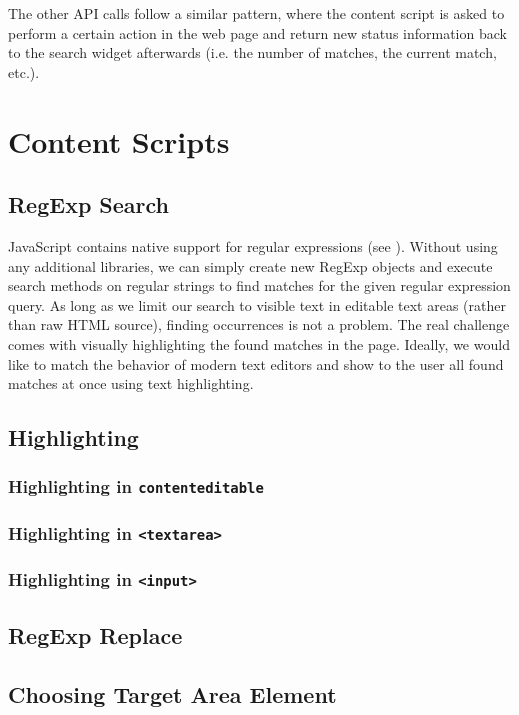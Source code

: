 \documentclass[bsc,frontabs,twoside,singlespacing,parskip,deptreport]{infthesis}
\begin{document}
The other API calls follow a similar pattern, where the content script is asked to perform a certain action in the web page and return new status information back to the search widget afterwards (i.e. the number of matches, the current match, etc.).

\section{Content Scripts}
\subsection{RegExp Search}
JavaScript contains native support for regular expressions (see \cite{M8}). Without using any additional libraries, we can simply create new RegExp objects and execute search methods on regular strings to find matches for the given regular expression query. As long as we limit our search to visible text in editable text areas (rather than raw HTML source), finding occurrences is not a problem. The real challenge comes with visually highlighting the found matches in the page. Ideally, we would like to match the behavior of modern text editors and show to the user all found matches at once using text highlighting.

\subsection{Highlighting}
\subsubsection{Highlighting in \texttt{contenteditable}}
\subsubsection{Highlighting in \texttt{\textless{}textarea\textgreater{}}}
\subsubsection{Highlighting in \texttt{\textless{}input\textgreater{}}}

\subsection{RegExp Replace}

\subsection{Choosing Target Area Element}
\end{document}
